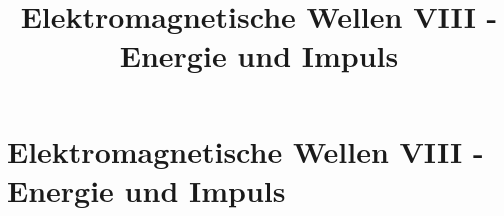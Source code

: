 
 \usetikzlibrary{overlay-beamer-styles}
  
\title[TET: Elektromagnetische Wellen VIII - Energie und Impuls]{Elektromagnetische Wellen VIII - Energie und Impuls}


% 
% 

\maketitle

% 
% 
\section{Elektromagnetische Wellen VIII - Energie und Impuls}

